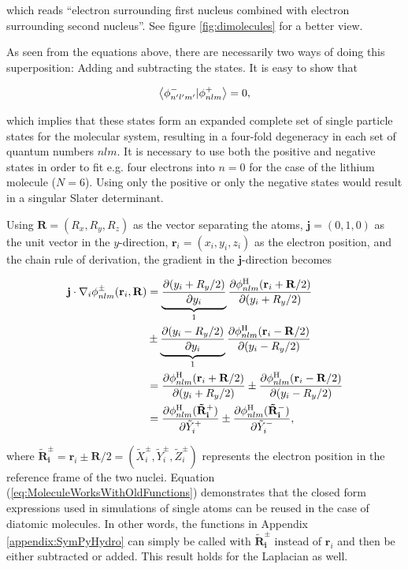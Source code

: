which reads ``electron surrounding first nucleus combined with electron surrounding second nucleus''. See figure \ref{fig:dimolecules} for a better view. 

As seen from the equations above, there are necessarily two ways of doing this superposition: Adding and subtracting the states. It is easy to show that 

\begin{equation}
 \left\langle \phi_{n'l'm'}^- | \phi_{nlm}^+\right\rangle = 0,
\end{equation}

which implies that these states form an expanded complete set of single particle states for the molecular system, resulting in a four-fold degeneracy in each set of quantum numbers $nlm$. It is necessary to use both the positive and negative states in order to fit e.g. four electrons into $n=0$ for the case of the lithium molecule ($N=6$). Using only the positive or only the negative states would result in a singular Slater determinant.

Using $\mathbf{R} = \left(R_x, R_y, R_z\right)$ as the vector separating the atoms, $\mathbf{j} = (0, 1, 0)$ as the unit vector in the $y$-direction, $\mathbf{r}_i = \left(x_i, y_i, z_i\right)$ as the electron position, and the chain rule of derivation, the gradient in the $\mathbf{j}$-direction becomes

\begin{align}
 \mathbf{j}\cdot \nabla_i \phi_{nlm}^\pm (\mathbf{r}_i, \mathbf{R}) &= \underbrace{\frac{\partial (y_i + R_y/2)}{\partial y_i}}_{1}\frac{\partial \phi_{nlm}^\mathrm{H}(\mathbf{r}_i + \mathbf{R}/2)}{\partial (y_i + R_y/2)} \notag \\
  &\pm \underbrace{\frac{\partial (y_i - R_y/2)}{\partial y_i}}_{1}\frac{\partial \phi_{nlm}^\mathrm{H}(\mathbf{r}_i - \mathbf{R}/2)}{\partial (y_i - R_y/2)} \notag\\
  &= \frac{\partial \phi_{nlm}^\mathrm{H}(\mathbf{r}_i + \mathbf{R}/2)}{\partial (y_i + R_y/2)} \pm \frac{\partial \phi_{nlm}^\mathrm{H}(\mathbf{r}_i - \mathbf{R}/2)}{\partial (y_i - R_y/2)} \notag\\
  &=  \frac{\partial \phi_{nlm}^\mathrm{H}(\mathbf{\tilde R_i^+})}{\partial \tilde Y_i^+} \pm \frac{\partial \phi_{nlm}^\mathrm{H}(\mathbf{\tilde R_i^-})}{\partial \tilde Y_i^-}, \label{eq:MoleculeWorksWithOldFunctions}
\end{align}

where $\mathbf{\tilde R_i^\pm} = \mathbf{r}_i \pm \mathbf{R}/2 = (\tilde X_i^\pm, \tilde Y_i^\pm, \tilde Z_i^\pm)$ represents the electron position in the reference frame of the two nuclei. Equation (\ref{eq:MoleculeWorksWithOldFunctions}) demonstrates that the closed form expressions used in simulations of single atoms can be reused in the case of diatomic molecules. In other words, the functions in Appendix \ref{appendix:SymPyHydro} can simply be called  with $\mathbf{\tilde R_i^\pm}$ instead of $\mathbf{r}_i$ and then be either subtracted or added. This result holds for the Laplacian as well.

